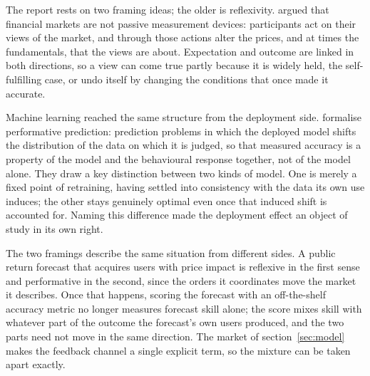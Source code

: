 \documentclass[12pt]{article}
\begin{document}
The report rests on two framing ideas; the older is reflexivity. \citet{soros1987} argued that financial markets are not passive measurement devices: participants act on their views of the market, and through those actions alter the prices, and at times the fundamentals, that the views are about. Expectation and outcome are linked in both directions, so a view can come true partly because it is widely held, the self-fulfilling case, or undo itself by changing the conditions that once made it accurate. %

Machine learning reached the same structure from the deployment side. \citet{perdomo2020} formalise performative prediction: prediction problems in which the deployed model shifts the distribution of the data on which it is judged, so that measured accuracy is a property of the model and the behavioural response together, not of the model alone. They draw a key distinction between two kinds of model. One is merely a fixed point of retraining, having settled into consistency with the data its own use induces; the other stays genuinely optimal even once that induced shift is accounted for. Naming this difference made the deployment effect an object of study in its own right. %

The two framings describe the same situation from different sides. A public return forecast that acquires users with price impact is reflexive in the first sense and performative in the second, since the orders it coordinates move the market it describes. Once that happens, scoring the forecast with an off-the-shelf accuracy metric no longer measures forecast skill alone; the score mixes skill with whatever part of the outcome the forecast's own users produced, and the two parts need not move in the same direction. The market of section~\ref{sec:model} makes the feedback channel a single explicit term, so the mixture can be taken apart exactly. %
\end{document}
